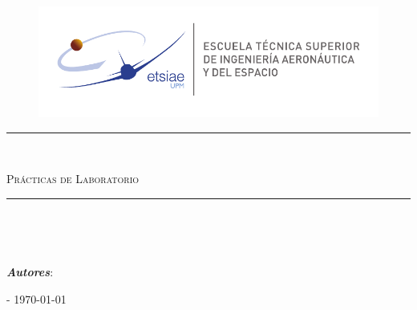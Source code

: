 \begin{titlepage}
    \begin{center}
    
        \begin{figure}[!htb]
            \centering
            \includegraphics[width = 0.9\linewidth]{include/figures/logo.pdf}
        \end{figure}
        \rule{\linewidth}{0.3mm}\\

        \vspace*{0.4cm}    
        \begin{large}
          \textsc{Prácticas de Laboratorio}
        \end{large}
    
        \vspace*{0.1cm}
        \begin{Large}
          \textbf{\Subject}
        \end{Large}
        
        \vspace*{0.1cm}
        \begin{large}
          \underline{\textsc{\Lab}}
        \end{large}

          
        \rule{\linewidth}{0.3mm}\\  

        \vspace*{1cm}
        \begin{small}
            \textbf{ \Degree } \\
            \Especiality
        \end{small}

    \vspace*{2cm}

    \textit{\textbf{Autores}}: \linebreak \textsc{\Author}

        \vspace*{3cm}
        \begin{large}
            \textsc{\Location - \today}
		\end{large}
    \end{center}
\end{titlepage}
